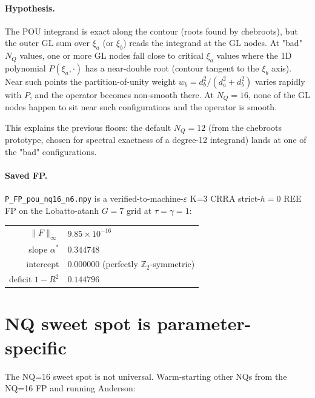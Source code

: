 \documentclass[11pt]{article}
\begin{document}
\paragraph{Hypothesis.} The POU integrand is exact along the contour
(roots found by chebroots), but the outer GL sum over $\xi_a$ (or
$\xi_b$) reads the integrand at the GL nodes. At "bad" $N_Q$ values,
one or more GL nodes fall close to critical $\xi_a$ values where the
1D polynomial $P(\xi_a, \cdot)$ has a near-double root (contour
tangent to the $\xi_b$ axis). Near such points the partition-of-unity
weight $w_b = d_b^2/(d_a^2+d_b^2)$ varies rapidly with $P$, and the
operator becomes non-smooth there. At $N_Q = 16$, none of the GL nodes
happen to sit near such configurations and the operator is smooth.

This explains the previous floors: the default $N_Q = 12$ (from the
chebroots prototype, chosen for spectral exactness of a degree-12
integrand) lands at one of the "bad" configurations.

\paragraph{Saved FP.} \texttt{P\_FP\_pou\_nq16\_n6.npy} is a
verified-to-machine-$\varepsilon$ K=3 CRRA strict-$h{=}0$ REE FP on
the Lobatto-atanh $G{=}7$ grid at $\tau{=}\gamma{=}1$:
\begin{center}
\begin{tabular}{rl}
\toprule
$\|F\|_\infty$ & $9.85\!\times\!10^{-16}$ \\
slope $\alpha^*$ & $0.344748$ \\
intercept & $0.000000$ (perfectly $\mathbb{Z}_2$-symmetric) \\
deficit $1-R^2$ & $0.144796$ \\
\bottomrule
\end{tabular}
\end{center}

\section{NQ sweet spot is parameter-specific}

The NQ=16 sweet spot is not universal. Warm-starting other NQs from
the NQ=16 FP and running Anderson:
\end{document}
